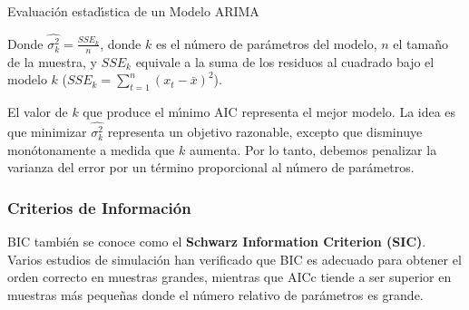 \documentclass[spanish,xcolor=table]{beamer}
\begin{document}
\begin{section}{Evaluaci\'on estad\'{\i}stica de un Modelo ARIMA}
\begin{frame}
\vspace{4mm}	
Donde $\hat{\sigma_k^2} = \frac{SSE_k}{n}$, donde $k$ es el n\'umero de par\'ametros del modelo, $n$ el tama\~no de la muestra, y $SSE_k$ equivale a la suma de los residuos al cuadrado bajo el modelo $k$ ($SSE_k=\sum_{t=1}^{n}(x_t-\bar{x})^2$). 
\par
\vspace{4mm}	
El valor de $k$ que produce el m\'{\i}nimo AIC representa el mejor modelo. La idea es que minimizar $\hat{\sigma_k^2}$ representa un objetivo razonable, excepto que disminuye mon\'otonamente a medida que $k$ aumenta. Por lo tanto, debemos penalizar la varianza del error por un t\'ermino proporcional al n\'umero de par\'ametros.

\end{frame}

\begin{frame}
\frametitle{Criterios de Informaci\'on}


BIC tambi\'en se conoce como el \textbf{Schwarz Information Criterion (SIC)}. Varios estudios de simulaci\'on han verificado que BIC es adecuado para obtener el orden correcto en muestras grandes, mientras que AICc tiende a ser superior en muestras m\'as peque\~nas donde el n\'umero relativo de par\'ametros es grande.

\end{frame}


\end{section}
\end{document}

